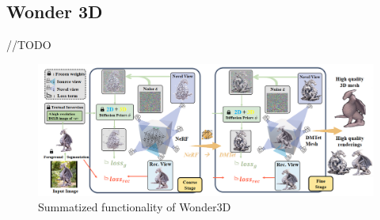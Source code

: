 \subsection{Wonder 3D}\label{Wonder3D}

//TODO

\begin{figure}[H]
    \centering
      \includegraphics[width=1\columnwidth]{figures/Magic123.png}
      \caption{Summatized functionality of Wonder3D}\label{fig:Wonder3D}
\end{figure}